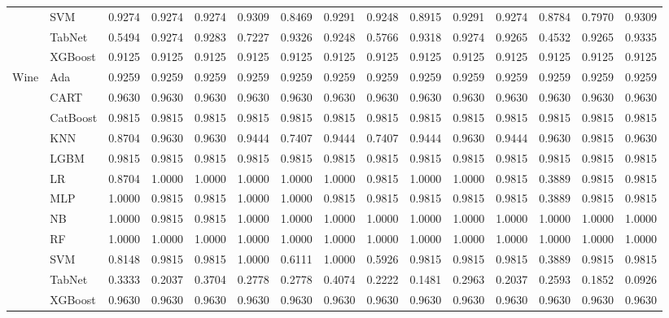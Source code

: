 \begin{table*}[ht]
{\begin{tabular}{llrrrrrrrrrrrrr}
 & SVM & 0.9274 & 0.9274 & 0.9274 & 0.9309 & 0.8469 & 0.9291 & 0.9248 & 0.8915 & 0.9291 & 0.9274 & 0.8784 & 0.7970 & 0.9309 \\
 & TabNet & 0.5494 & 0.9274 & 0.9283 & 0.7227 & 0.9326 & 0.9248 & 0.5766 & 0.9318 & 0.9274 & 0.9265 & 0.4532 & 0.9265 & 0.9335 \\
 & XGBoost & 0.9125 & 0.9125 & 0.9125 & 0.9125 & 0.9125 & 0.9125 & 0.9125 & 0.9125 & 0.9125 & 0.9125 & 0.9125 & 0.9125 & 0.9125 \\
\cline{1-15}
\multirow[t]{12}{*}{Wine} & Ada & 0.9259 & 0.9259 & 0.9259 & 0.9259 & 0.9259 & 0.9259 & 0.9259 & 0.9259 & 0.9259 & 0.9259 & 0.9259 & 0.9259 & 0.9259 \\
 & CART & 0.9630 & 0.9630 & 0.9630 & 0.9630 & 0.9630 & 0.9630 & 0.9630 & 0.9630 & 0.9630 & 0.9630 & 0.9630 & 0.9630 & 0.9630 \\
 & CatBoost & 0.9815 & 0.9815 & 0.9815 & 0.9815 & 0.9815 & 0.9815 & 0.9815 & 0.9815 & 0.9815 & 0.9815 & 0.9815 & 0.9815 & 0.9815 \\
 & KNN & 0.8704 & 0.9630 & 0.9630 & 0.9444 & 0.7407 & 0.9444 & 0.7407 & 0.9444 & 0.9630 & 0.9444 & 0.9630 & 0.9815 & 0.9630 \\
 & LGBM & 0.9815 & 0.9815 & 0.9815 & 0.9815 & 0.9815 & 0.9815 & 0.9815 & 0.9815 & 0.9815 & 0.9815 & 0.9815 & 0.9815 & 0.9815 \\
 & LR & 0.8704 & 1.0000 & 1.0000 & 1.0000 & 1.0000 & 1.0000 & 0.9815 & 1.0000 & 1.0000 & 0.9815 & 0.3889 & 0.9815 & 0.9815 \\
 & MLP & 1.0000 & 0.9815 & 0.9815 & 1.0000 & 1.0000 & 0.9815 & 0.9815 & 0.9815 & 0.9815 & 0.9815 & 0.3889 & 0.9815 & 0.9815 \\
 & NB & 1.0000 & 0.9815 & 0.9815 & 1.0000 & 1.0000 & 1.0000 & 1.0000 & 1.0000 & 1.0000 & 1.0000 & 1.0000 & 1.0000 & 1.0000 \\
 & RF & 1.0000 & 1.0000 & 1.0000 & 1.0000 & 1.0000 & 1.0000 & 1.0000 & 1.0000 & 1.0000 & 1.0000 & 1.0000 & 1.0000 & 1.0000 \\
 & SVM & 0.8148 & 0.9815 & 0.9815 & 1.0000 & 0.6111 & 1.0000 & 0.5926 & 0.9815 & 0.9815 & 0.9815 & 0.3889 & 0.9815 & 0.9815 \\
 & TabNet & 0.3333 & 0.2037 & 0.3704 & 0.2778 & 0.2778 & 0.4074 & 0.2222 & 0.1481 & 0.2963 & 0.2037 & 0.2593 & 0.1852 & 0.0926 \\
 & XGBoost & 0.9630 & 0.9630 & 0.9630 & 0.9630 & 0.9630 & 0.9630 & 0.9630 & 0.9630 & 0.9630 & 0.9630 & 0.9630 & 0.9630 & 0.9630 \\
\cline{1-15}
\bottomrule
\end{tabular}
}
\end{table*}